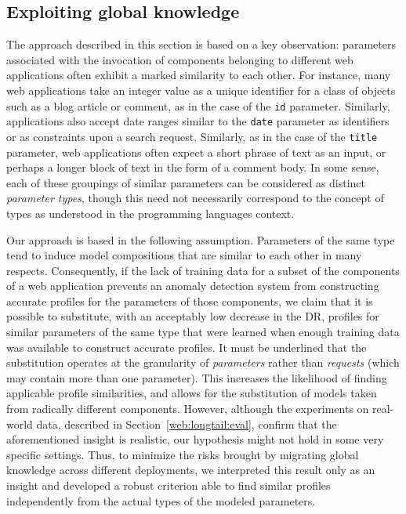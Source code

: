 \subsection{Exploiting global knowledge}
\label{web:longtail:design}
The approach described in this section is based on a key observation: parameters associated with the invocation of components belonging to different web applications often exhibit a marked similarity to each other. For instance, many web applications take an integer value as a unique identifier for a class of objects such as a blog article or comment, as in the case of the \texttt{id} parameter.  Similarly, applications also accept date ranges similar to the \texttt{date} parameter as identifiers or as constraints upon a search request.  Similarly, as in the case of the \texttt{title} parameter, web applications often expect a short phrase of text as an input, or perhaps a longer block of text in the form of a comment body. In some sense, each of these groupings of similar parameters can be considered as distinct \emph{parameter types}, though this need not necessarily correspond to the concept of types as understood in the programming languages context.

Our approach is based in the following assumption. Parameters of the
same type tend to induce model compositions that are similar to each
other in many respects. Consequently, if the lack of training data for
a subset of the components of a web application prevents an anomaly
detection system from constructing accurate profiles for the
parameters of those components, we claim that it is possible to
substitute, with an acceptably low decrease in the \ac{DR}, profiles
for similar parameters of the same type that were learned when enough
training data was available to construct accurate profiles. It must be
underlined that the substitution operates at the granularity of
\emph{parameters} rather than \emph{requests} (which may contain more
than one parameter). This increases the likelihood of finding
applicable profile similarities, and allows for the substitution of
models taken from radically different components.  However, although
the experiments on real-world data, described in
Section~\ref{web:longtail:eval}, confirm that the aforementioned
insight is realistic, our hypothesis might not hold in some very
specific settings. Thus, to minimize the risks brought by migrating
global knowledge across different deployments, we interpreted this
result only as an insight and developed a robust criterion able to
find similar profiles independently from the actual types of the
modeled parameters.

